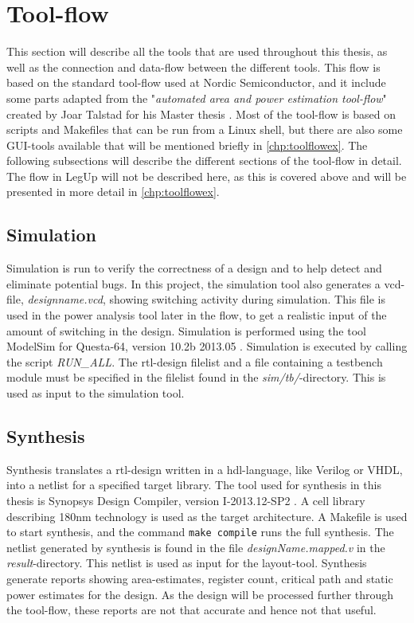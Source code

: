 \section{\label{sec:toolflowbg}Tool-flow}
This section will describe all the tools that are used throughout this thesis, as well as the connection and data-flow between the different tools. This flow is based on the standard tool-flow used at Nordic Semiconductor, and it include some parts adapted from the "\textit{automated area and power estimation tool-flow}" created by Joar Talstad for his Master thesis \cite{talstad15master}. Most of the tool-flow is based on scripts and Makefiles that can be run from a Linux shell, but there are also some GUI-tools available that will be mentioned briefly in \cref{chp:toolflowex}. The following subsections will describe the different sections of the tool-flow in detail. The flow in LegUp will not be described here, as this is covered above and will be presented in more detail in \cref{chp:toolflowex}.

\subsection{Simulation}
Simulation is run to verify the correctness of a design and to help detect and eliminate potential bugs. In this project, the simulation tool also generates a \gls{vcd}-file, \textit{designname.vcd}, showing switching activity during simulation. This file is used in the power analysis tool later in the flow, to get a realistic input of the amount of switching in the design. Simulation is performed using the tool ModelSim for Questa-64, version 10.2b 2013.05 \cite{questasim}. Simulation is executed by calling the script \textit{RUN\_ALL}. The \gls{rtl}-design filelist and a file containing a testbench module must be specified in the filelist found in the \textit{sim/tb/}-directory. This is used as input to the simulation tool.
\subsection{Synthesis}
Synthesis translates a \gls{rtl}-design written in a \gls{hdl}-language, like Verilog or VHDL, into a netlist for a specified target library. The tool used for synthesis in this thesis is Synopsys Design Compiler, version I-2013.12-SP2 \cite{syndescomp}. A cell library describing 180nm technology is used as the target architecture. A Makefile is used to start synthesis, and the command \verb!make compile! runs the full synthesis. The netlist generated by synthesis is found in the file \textit{designName.mapped.v} in the \textit{result}-directory. This netlist is used as input for the layout-tool. Synthesis generate reports showing area-estimates, register count, critical path and static power estimates for the design. As the design will be processed further through the tool-flow, these reports are not that accurate and hence not that useful.
